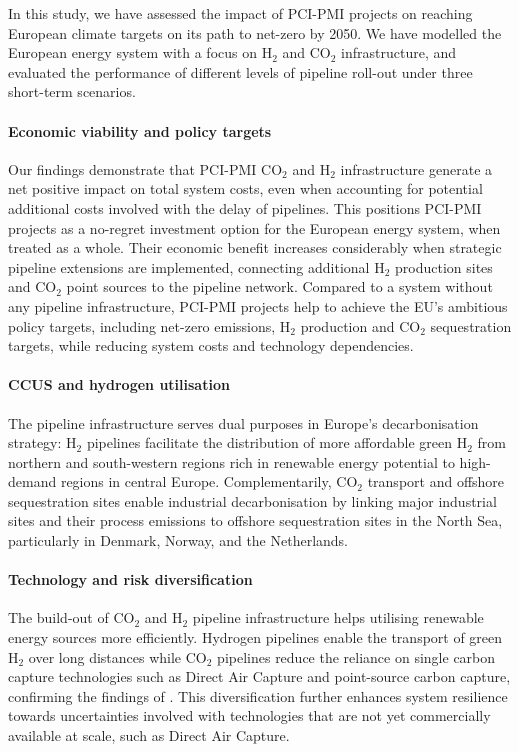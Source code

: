 \documentclass[pdflatex,sn-nature]{sn-jnl}
\theoremstyle{thmstyleone}%
\theoremstyle{thmstyletwo}%
\theoremstyle{thmstylethree}%
\begin{document}
In this study, we have assessed the impact of PCI-PMI projects on reaching European climate targets on its path to net-zero by 2050. We have modelled the European energy system with a focus on H$_2$ and CO$_2$ infrastructure, and evaluated the performance of different levels of pipeline roll-out under three short-term scenarios. 

\paragraph{Economic viability and policy targets}
Our findings demonstrate that PCI-PMI CO$_2$ and H$_2$ infrastructure generate a net positive impact on total system costs, even when accounting for potential additional costs involved with the delay of pipelines. This positions PCI-PMI projects as a no-regret investment option for the European energy system, when treated as a whole.
Their economic benefit increases considerably when strategic pipeline extensions are implemented, connecting additional H$_2$ production sites and CO$_2$ point sources to the pipeline network. 
Compared to a system without any pipeline infrastructure, PCI-PMI projects help to achieve the EU's ambitious policy targets, including net-zero emissions, H$_2$ production and CO$_2$ sequestration targets, while reducing system costs and technology dependencies.

\paragraph{CCUS and hydrogen utilisation}
The pipeline infrastructure serves dual purposes in Europe's decarbonisation strategy: H$_2$ pipelines facilitate the distribution of more affordable green H$_2$ from northern and south-western regions rich in renewable energy potential to high-demand regions in central Europe. Complementarily, CO$_2$ transport and offshore sequestration sites enable industrial decarbonisation by linking major industrial sites and their process emissions to offshore sequestration sites in the North Sea, particularly in Denmark, Norway, and the Netherlands.

\paragraph{Technology and risk diversification}
The build-out of CO$_2$ and H$_2$ pipeline infrastructure helps utilising renewable energy sources more efficiently. Hydrogen pipelines enable the transport of green H$_2$ over long distances while CO$_2$ pipelines reduce the reliance on single carbon capture technologies such as Direct Air Capture and point-source carbon capture, confirming the findings of \cite{hofmannH2CO2Network2025}. This diversification further enhances system resilience towards uncertainties involved with technologies that are not yet commercially available at scale, such as Direct Air Capture.
\end{document}
